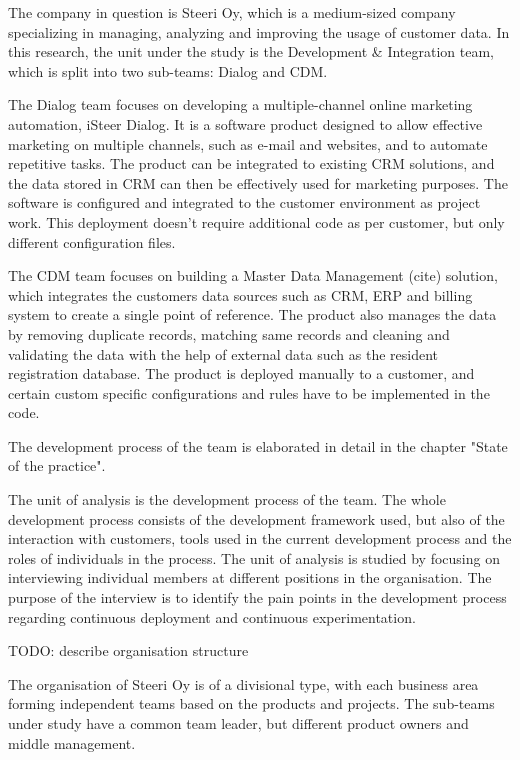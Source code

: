 \documentclass[english]{tktltiki2}
\theoremstyle{definition}
\theoremstyle{remark}
\begin{document}
The company in question is Steeri Oy, which is a medium-sized company specializing in managing, analyzing and improving the usage of customer data. In this research, the unit under the study is the Development & Integration team, which is split into two sub-teams: Dialog and CDM. 

The Dialog team focuses on developing a multiple-channel online marketing automation, iSteer Dialog. It is a software product designed to allow effective marketing on multiple channels, such as e-mail and websites, and to automate repetitive tasks. The product can be integrated to existing CRM solutions, and the data stored in CRM can then be effectively used for marketing purposes. The software is configured and integrated to the customer environment as project work. This deployment doesn't require additional code as per customer, but only different configuration files. 

The CDM team focuses on building a Master Data Management (cite) solution, which integrates the customers data sources such as CRM, ERP and billing system to create a single point of reference. The product also manages the data by removing duplicate records, matching same records and cleaning and validating the data with the help of external data such as the resident registration database. The product is deployed manually to a customer, and certain custom specific configurations and rules have to be implemented in the code. 

The development process of the team is elaborated in detail in the chapter "State of the practice". 

The unit of analysis is the development process of the team. The whole development process consists of the development framework used, but also of the interaction with customers, tools used in the current development process and the roles of individuals in the process. The unit of analysis is studied by focusing on interviewing individual members at different positions in the organisation. The purpose of the interview is to identify the pain points in the development process regarding continuous deployment and continuous experimentation. 

TODO: describe organisation structure %

The organisation of Steeri Oy is of a divisional type, with each business area forming independent teams based on the products and projects. The sub-teams under study have a common team leader, but different product owners and middle management. 
\end{document}
